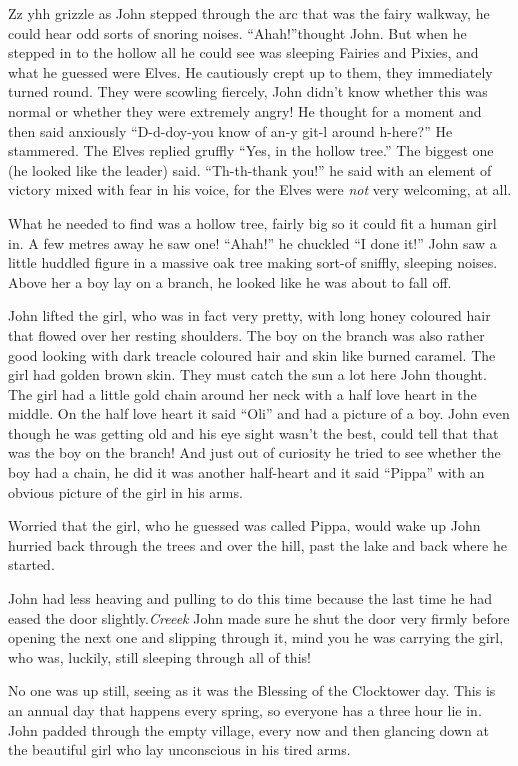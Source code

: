 Zz yhh grizzle as John stepped through the arc that was the fairy
walkway, he could hear odd sorts of snoring noises. ``Ahah!''thought
John. But when he stepped in to the hollow all he could see was sleeping
Fairies and Pixies, and what he guessed were Elves. He cautiously crept
up to them, they immediately turned round. They were scowling fiercely,
John didn't know whether this was normal or whether they were extremely
angry! He thought for a moment and then said anxiously ``D-d-doy-you
know of an-y git-l around h-here?'' He stammered. The Elves replied
gruffly ``Yes, in the hollow tree.'' The biggest one (he looked like the
leader) said. ``Th-th-thank you!'' he said with an element of victory
mixed with fear in his voice, for the Elves were \emph{not} very
welcoming, at all.

What he needed to find was a hollow tree, fairly big so it could fit a
human girl in. A few metres away he saw one! ``Ahah!'' he chuckled ``I
done it!'' John saw a little huddled figure in a massive oak tree making
sort-of sniffly, sleeping noises. Above her a boy lay on a branch, he
looked like he was about to fall off.

John lifted the girl, who was in fact very pretty, with long honey
coloured hair that flowed over her resting shoulders. The boy on the
branch was also rather good looking with dark treacle coloured hair and
skin like burned caramel. The girl had golden brown skin. They must
catch the sun a lot here John thought. The girl had a little gold chain
around her neck with a half love heart in the middle. On the half love
heart it said ``Oli'' and had a picture of a boy. John even though he
was getting old and his eye sight wasn't the best, could tell that that
was the boy on the branch! And just out of curiosity he tried to see
whether the boy had a chain, he did it was another half-heart and it
said ``Pippa'' with an obvious picture of the girl in his arms.

Worried that the girl, who he guessed was called Pippa, would wake up
John hurried back through the trees and over the hill, past the lake and
back where he started.

John had less heaving and pulling to do this time because the last time
he had eased the door slightly.\emph{Creeek} John made sure he shut the
door very firmly before opening the next one and slipping through it,
mind you he was carrying the girl, who was, luckily, still sleeping
through all of this!

No one was up still, seeing as it was the Blessing of the Clocktower
day. This is an annual day that happens every spring, so everyone has a
three hour lie in. John padded through the empty village, every now and
then glancing down at the beautiful girl who lay unconscious in his
tired arms.

